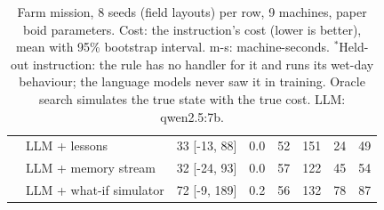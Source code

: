 \begin{table}[h!]
{\begin{tabular}{llcccccc}
 & LLM + lessons & 33 [-13, 88] & 0.0 & 52 & 151 & 24 & 49 \\
 & LLM + memory stream & 32 [-24, 93] & 0.0 & 57 & 122 & 45 & 54 \\
 & LLM + what-if simulator & 72 [-9, 189] & 0.2 & 56 & 132 & 78 & 87 \\
\hline
\end{tabular}}
\caption{Farm mission, 8 seeds (field layouts) per row, 9 machines, paper boid parameters. Cost: the instruction's cost (lower is better), mean with 95\% bootstrap interval. m-s: machine-seconds. $^*$Held-out instruction: the rule has no handler for it and runs its wet-day behaviour; the language models never saw it in training. Oracle search simulates the true state with the true cost. LLM: qwen2.5:7b.}
\label{tab:farm}
\end{table}
